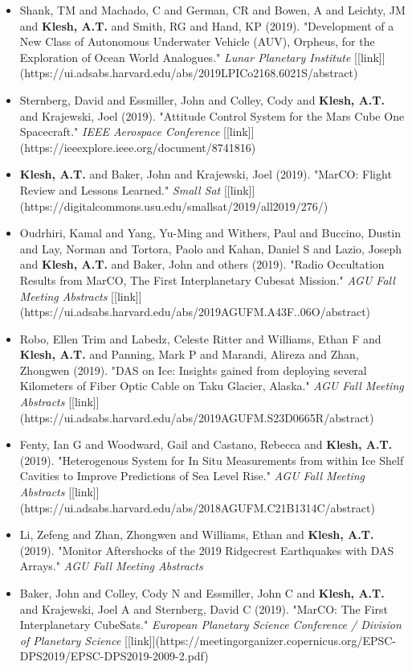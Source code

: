 \documentclass[11pt,letterpaper]{article}
\begin{document}
\begin{itemize}
\item Shank, TM and Machado, C and German, CR and Bowen, A and Leichty, JM and \textbf{Klesh, A.T.} and Smith, RG and Hand, KP (2019). "Development of a New Class of Autonomous Underwater Vehicle (AUV), Orpheus, for the Exploration of Ocean World Analogues." \textit{Lunar Planetary Institute} [[link]](https://ui.adsabs.harvard.edu/abs/2019LPICo2168.6021S/abstract)
\item Sternberg, David and Essmiller, John and Colley, Cody and \textbf{Klesh, A.T.} and Krajewski, Joel (2019). "Attitude Control System for the Mars Cube One Spacecraft." \textit{IEEE Aerospace Conference} [[link]](https://ieeexplore.ieee.org/document/8741816)
\item \textbf{Klesh, A.T.} and Baker, John and Krajewski, Joel (2019). "MarCO: Flight Review and Lessons Learned." \textit{Small Sat} [[link]](https://digitalcommons.usu.edu/smallsat/2019/all2019/276/)
\item Oudrhiri, Kamal and Yang, Yu-Ming and Withers, Paul and Buccino, Dustin and Lay, Norman and Tortora, Paolo and Kahan, Daniel S and Lazio, Joseph and \textbf{Klesh, A.T.} and Baker, John and others (2019). "Radio Occultation Results from MarCO, The First Interplanetary Cubesat Mission." \textit{AGU Fall Meeting Abstracts} [[link]](https://ui.adsabs.harvard.edu/abs/2019AGUFM.A43F..06O/abstract)
\item Robo, Ellen Trim and Labedz, Celeste Ritter and Williams, Ethan F and \textbf{Klesh, A.T.} and Panning, Mark P and Marandi, Alireza and Zhan, Zhongwen (2019). "DAS on Ice: Insights gained from deploying several Kilometers of Fiber Optic Cable on Taku Glacier, Alaska." \textit{AGU Fall Meeting Abstracts} [[link]](https://ui.adsabs.harvard.edu/abs/2019AGUFM.S23D0665R/abstract)
\item Fenty, Ian G and Woodward, Gail and Castano, Rebecca and \textbf{Klesh, A.T.} (2019). "Heterogenous System for In Situ Measurements from within Ice Shelf Cavities to Improve Predictions of Sea Level Rise." \textit{AGU Fall Meeting Abstracts} [[link]](https://ui.adsabs.harvard.edu/abs/2018AGUFM.C21B1314C/abstract)
\item Li, Zefeng and Zhan, Zhongwen and Williams, Ethan and \textbf{Klesh, A.T.} (2019). "Monitor Aftershocks of the 2019 Ridgecrest Earthquakes with DAS Arrays." \textit{AGU Fall Meeting Abstracts}
\item Baker, John and Colley, Cody N and Essmiller, John C and \textbf{Klesh, A.T.} and Krajewski, Joel A and Sternberg, David C (2019). "MarCO: The First Interplanetary CubeSats." \textit{European Planetary Science Conference / Division of Planetary Science} [[link]](https://meetingorganizer.copernicus.org/EPSC-DPS2019/EPSC-DPS2019-2009-2.pdf)

\end{itemize}
\end{document}
